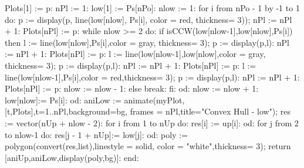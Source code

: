 \documentclass[12pt]{article}
\begin{document}
\begin{itemize}
\begin{spverbatim}
    Plots[1] := p: nPl := 1:
    low[1] := Ps[nPo]: nlow := 1:
    for i from nPo - 1 by -1 to 1 do:
      p := display(p, line(low[nlow], Ps[i], color = red, thickness= 3));
      nPl := nPl + 1: Plots[nPl] := p:
      while nlow >= 2 do:
        if isCCW(low[nlow-1],low[nlow],Ps[i]) then 
          l := line(low[nlow],Ps[i],color = gray, thickness= 3);
          p := display(p,l): nPl := nPl + 1: Plots[nPl] := p:
          l := line(low[nlow-1],low[nlow],color = gray, thickness= 3);
          p := display(p,l): nPl := nPl + 1: Plots[nPl] := p:
          l := line(low[nlow-1],Ps[i],color = red,thickness= 3);
          p := display(p,l): nPl := nPl + 1: Plots[nPl] := p:
          nlow := nlow - 1:
        else break: fi:
      od:
      nlow := nlow + 1: low[nlow]:= Ps[i]:
    od:
    aniLow := animate(myPlot,[t,Plots],t=1..nPl,background=bg, frames = nPl,title="Convex Hull - low");
    res := vector(nUp + nlow - 2):
    for i from 1 to nUp do: res[i] := up[i]: od:
    for j from 2 to nlow-1 do: res[j - 1 + nUp]:= low[j]: od:
    poly := polygon(convert(res,list),linestyle = solid, color = "white",thickness= 3);
    return [aniUp,aniLow,display(poly,bg)]:
  end:
            \end{spverbatim}
            \newpage
        \end{itemize}
\end{document}
